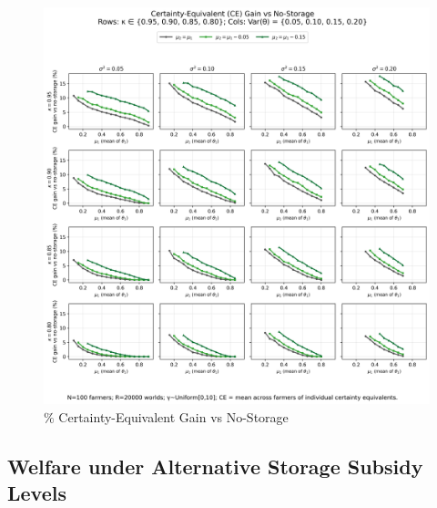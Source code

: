 \begin{figure}[ht!]
    \centering
    \includegraphics[width=\linewidth]{model_figures/cegain_grid_4x4.png}
    \caption{$\%$ Certainty-Equivalent Gain vs No-Storage}
    \label{fig:CE gains}
\end{figure}



\subsection{Welfare under Alternative Storage Subsidy Levels}


